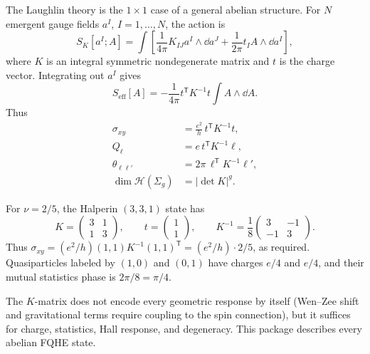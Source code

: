 The Laughlin theory is the $1\times 1$ case of a general abelian structure. For $N$ emergent gauge fields $a^I$, $I=1,\ldots,N$, the action is
\begin{equation}
  S_K[a^I;A]
  =
  \int\left[
  \frac{1}{4\pi}K_{IJ}a^I\wedge\dd a^J
  +
  \frac{1}{2\pi}t_I A\wedge\dd a^I
  \right],
  \label{eq:fqhe-k-matrix-action}
\end{equation}
where $K$ is an integral symmetric nondegenerate matrix and $t$ is the charge vector. Integrating out $a^I$ gives
\begin{equation}
  S_{\mathrm{eff}}[A]
  =
  -\frac{1}{4\pi}
  t^{\mathsf T}K^{-1}t
  \int A\wedge\dd A.
  \label{eq:fqhe-k-effective}
\end{equation}
Thus
\begin{align}
  \sigma_{xy}
  &=
  \frac{e^2}{h}\,t^{\mathsf T}K^{-1}t,
  \label{eq:fqhe-k-hall}
  \\
  Q_\ell
  &=
  e\,t^{\mathsf T}K^{-1}\ell,
  \label{eq:fqhe-k-charge}
  \\
  \theta_{\ell\ell'}
  &=
  2\pi\,\ell^{\mathsf T}K^{-1}\ell',
  \label{eq:fqhe-k-mutual}
  \\
  \dim\mathcal H(\Sigma_g)
  &=
  |\det K|^g.
  \label{eq:fqhe-k-degeneracy}
\end{align}

For $\nu=2/5$, the Halperin $(3,3,1)$ state has
\begin{equation}
  K=\begin{pmatrix}3&1\\1&3\end{pmatrix},
  \qquad
  t=\begin{pmatrix}1\\1\end{pmatrix},
  \qquad
  K^{-1}=\frac{1}{8}\begin{pmatrix}3&-1\\-1&3\end{pmatrix}.
  \label{eq:fqhe-halperin-331}
\end{equation}
Thus $\sigma_{xy}=(e^2/h)(1,1)K^{-1}(1,1)^{\mathsf T}=(e^2/h)\cdot 2/5$, as required. Quasiparticles labeled by $(1,0)$ and $(0,1)$ have charges $e/4$ and $e/4$, and their mutual statistics phase is $2\pi/8=\pi/4$.

The $K$-matrix does not encode every geometric response by itself (Wen--Zee shift and gravitational terms require coupling to the spin connection), but it suffices for charge, statistics, Hall response, and degeneracy. This package describes every abelian FQHE state.

